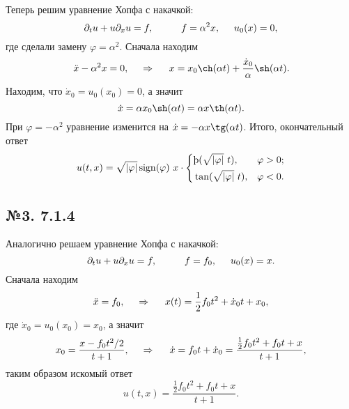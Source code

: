 Теперь решим уравнение Хопфа с накачкой:
\begin{equation*}
    \partial_t u + u \partial_x u = f,
    \hspace{10 mm} 
    f = \alpha^2 x,
    \hspace{5 mm} 
    u_0(x) = 0,
\end{equation*}
где сделали замену $\varphi = \alpha^2$.
Сначала находим
\begin{equation*}
    \ddot{x} - \alpha^2 x = 0,
    \hspace{0.5cm} \Rightarrow \hspace{0.5cm}   
    x = x_0 \ch(\alpha t) + \frac{\dot{x}_0}{\alpha} \sh(\alpha t).
\end{equation*}
Находим, что $\dot{x}_0 = u_0(x_0) =0$, а значит
\begin{equation*}
    \dot{x} = \alpha x_0 \sh(\alpha t) = \alpha x \th(\alpha t).
\end{equation*}
При $\varphi = -\alpha^2$ уравнение изменится на $\dot{x} = - \alpha x \tg(\alpha t)$. Итого, окончательный ответ
\begin{equation*}
    u(t, x) = \sqrt{|\varphi|} \sign(\varphi)\ x  \cdot \left\{\begin{aligned}
        &\th(\sqrt{|\varphi|} \ t),  &\varphi > 0; \\
        &\tan(\sqrt{|\varphi|} \ t),  &\varphi < 0. \\
    \end{aligned}\right.
\end{equation*}


\subsection*{№3. 7.1.4}

Аналогично решаем уравнение Хопфа с накачкой:
\begin{equation*}
    \partial_t u + u \partial_x u = f,
    \hspace{10 mm} 
    f = f_0,
    \hspace{5 mm} 
    u_0(x) = x.
\end{equation*}
Сначала находим
\begin{equation*}
    \ddot{x} = f_0,
    \hspace{0.5cm} \Rightarrow \hspace{0.5cm}
    x(t) = \frac{1}{2} f_0 t^2 + \dot{x}_0 t + x_0,
\end{equation*}
где $\dot{x}_0 = u_0 (x_0) = x_0$, а значит
\begin{equation*}
    x_0 = \frac{x - f_0 t^2/2}{t+1},
    \hspace{0.5cm} \Rightarrow \hspace{0.5cm}
    \dot{x} = f_0 t + \dot{x}_0 = \frac{\frac{1}{2} f_0 t^2 + f_0 t + x}{t+1},
\end{equation*}
таким образом искомый ответ
\begin{equation*}
    u(t, x) = \frac{\frac{1}{2} f_0 t^2 + f_0 t + x}{t+1}.
\end{equation*}



